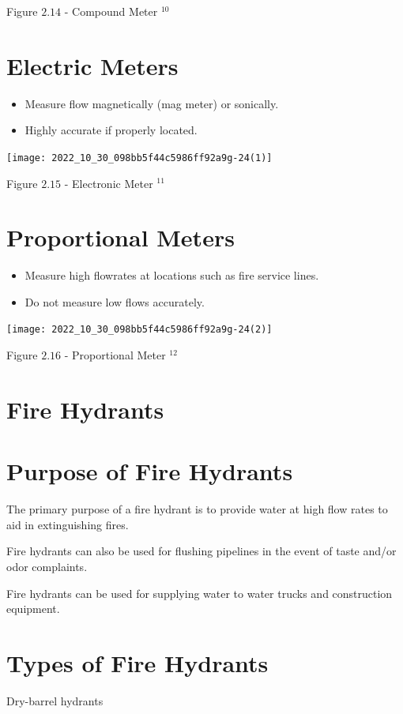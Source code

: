 \documentclass[10pt]{article}
\begin{document}
Figure $2.14$ - Compound Meter ${ }^{10}$

\section{Electric Meters}
\begin{itemize}
  \item Measure flow magnetically (mag meter) or sonically.

  \item Highly accurate if properly located.

\end{itemize}
\texttt{[image: 2022\_10\_30\_098bb5f44c5986ff92a9g-24(1)]}

Figure $2.15$ - Electronic Meter ${ }^{11}$

\section{Proportional Meters}
\begin{itemize}
  \item Measure high flowrates at locations such as fire service lines.

  \item Do not measure low flows accurately.

\end{itemize}
\texttt{[image: 2022\_10\_30\_098bb5f44c5986ff92a9g-24(2)]}

Figure $2.16$ - Proportional Meter ${ }^{12}$

\section{Fire Hydrants}
\section{Purpose of Fire Hydrants}
The primary purpose of a fire hydrant is to provide water at high flow rates to aid in extinguishing fires.

Fire hydrants can also be used for flushing pipelines in the event of taste and/or odor complaints.

Fire hydrants can be used for supplying water to water trucks and construction equipment.

\section{Types of Fire Hydrants}
Dry-barrel hydrants
\end{document}
